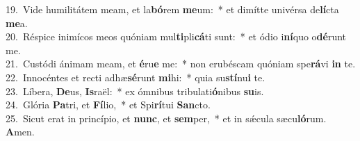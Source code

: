 {19.~}Vide humilitátem meam, et la\textbf{bó}rem \textbf{me}um:~* et dimítte univérsa de\textbf{lí}cta \textbf{me}a.\\
{20.~}Réspice inimícos meos quóniam mul\textbf{ti}pli\textbf{cá}ti sunt:~* et ódio i\textbf{ní}quo o\textbf{dé}runt me.\\
{21.~}Custódi ánimam meam, et \textbf{é}ru\textbf{e} me:~* non erubéscam quóniam spe\textbf{rá}vi \textbf{in} te.\\
{22.~}Innocéntes et recti adhæ\textbf{sé}runt \textbf{mi}hi:~* quia su\textbf{stí}nu\textbf{i} te.\\
{23.~}Líbera, \textbf{De}us, \textbf{Is}raël:~* ex ómnibus tribulati\textbf{ó}nibus \textbf{su}is.\\
{24.~}Glória \textbf{Pa}tri, et \textbf{Fí}lio,~* et Spi\textbf{rí}tui \textbf{San}cto.\\
{25.~}Sicut erat in princípio, et \textbf{nunc}, et \textbf{sem}per,~* et in sǽcula sæcu\textbf{ló}rum. \textbf{A}men.\\
